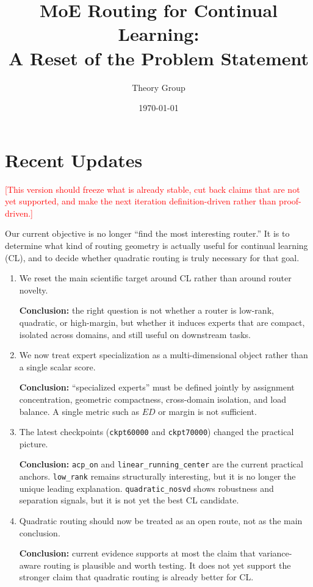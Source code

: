 \documentclass[11pt]{article}
\title{MoE Routing for Continual Learning:\\ A Reset of the Problem Statement}
\author{Theory Group}
\date{\today}
\newcommand{\idea}[1]{\textcolor{red}{[#1]}}
\begin{document}
\maketitle

\section{Recent Updates}

\idea{This version should freeze what is already stable, cut back claims that are not yet supported, and make the next iteration definition-driven rather than proof-driven.}

Our current objective is no longer ``find the most interesting router.'' It is to determine what kind of routing geometry is actually useful for continual learning (CL), and to decide whether quadratic routing is truly necessary for that goal.

\begin{enumerate}
    \item We reset the main scientific target around CL rather than around router novelty.

    \textbf{Conclusion:} the right question is not whether a router is low-rank, quadratic, or high-margin, but whether it induces experts that are compact, isolated across domains, and still useful on downstream tasks.

    \item We now treat expert specialization as a multi-dimensional object rather than a single scalar score.

    \textbf{Conclusion:} ``specialized experts'' must be defined jointly by assignment concentration, geometric compactness, cross-domain isolation, and load balance. A single metric such as $ED$ or margin is not sufficient.

    \item The latest checkpoints (\texttt{ckpt60000} and \texttt{ckpt70000}) changed the practical picture.

    \textbf{Conclusion:} \texttt{acp\_on} and \texttt{linear\_running\_center} are the current practical anchors. \texttt{low\_rank} remains structurally interesting, but it is no longer the unique leading explanation. \texttt{quadratic\_nosvd} shows robustness and separation signals, but it is not yet the best CL candidate.

    \item Quadratic routing should now be treated as an open route, not as the main conclusion.

    \textbf{Conclusion:} current evidence supports at most the claim that variance-aware routing is plausible and worth testing. It does not yet support the stronger claim that quadratic routing is already better for CL.
\end{enumerate}
\end{document}
